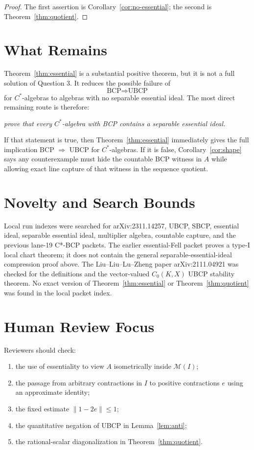 \documentclass[11pt]{article}
\newcommand{\Mcal}{\mathcal M}
\begin{document}
\begin{proof}
The first assertion is Corollary~\ref{cor:no-essential}; the second is
Theorem~\ref{thm:quotient}.
\end{proof}

\section*{What Remains}

Theorem~\ref{thm:essential} is a substantial positive theorem, but it is not
a full solution of Question 3.  It reduces the possible failure of
\[
        \text{BCP}\Rightarrow\text{UBCP}
\]
for \(C^*\)-algebras to algebras with no separable essential ideal.  The most
direct remaining route is therefore:

\begin{center}
\emph{prove that every \(C^*\)-algebra with BCP contains a separable
essential ideal.}
\end{center}

If that statement is true, then Theorem~\ref{thm:essential} immediately gives
the full implication BCP \(\Rightarrow\) UBCP for \(C^*\)-algebras.  If it is
false, Corollary~\ref{cor:shape} says any counterexample must hide the
countable BCP witness in \(A\) while allowing exact line capture of that
witness in the sequence quotient.

\section*{Novelty and Search Bounds}

Local run indexes were searched for arXiv:2311.14257, UBCP, SBCP, essential
ideal, separable essential ideal, multiplier algebra, countable capture, and
the previous lane-19 C*-BCP packets.  The earlier
essential-Fell packet proves a type-I local chart theorem; it does not contain
the general separable-essential-ideal compression proof above.  The
Liu--Liu--Lu--Zheng paper arXiv:2111.04921 was checked for the definitions
and the vector-valued \(C_0(K,X)\) UBCP stability theorem.  No exact version
of Theorem~\ref{thm:essential} or Theorem~\ref{thm:quotient} was found in the
local packet index.

\section*{Human Review Focus}

Reviewers should check:
\begin{enumerate}
    \item the use of essentiality to view \(A\) isometrically inside
          \(\Mcal(I)\);
    \item the passage from arbitrary contractions in \(I\) to positive
          contractions \(e\) using an approximate identity;
    \item the fixed estimate \(\|1-2e\|\le1\);
    \item the quantitative negation of UBCP in Lemma~\ref{lem:anti};
    \item the rational-scalar diagonalization in Theorem~\ref{thm:quotient}.
\end{enumerate}
\end{document}
